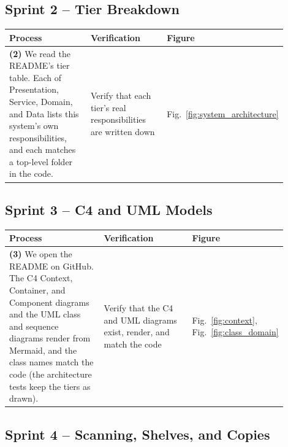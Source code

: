 \documentclass[12pt]{article}
\begin{document}
\subsection{Sprint 2 -- Tier Breakdown}

\begin{longtable}{L{0.4\linewidth} L{0.36\linewidth} L{0.14\linewidth}}
\toprule
\textbf{Process} & \textbf{Verification} & \textbf{Figure} \\
\midrule
\endhead
\textbf{(2)} We read the README's tier table. Each of Presentation, Service, Domain, and Data lists this system's own responsibilities, and each matches a top-level folder in the code. & Verify that each tier's real responsibilities are written down & Fig.~\ref{fig:system_architecture} \\
\bottomrule
\end{longtable}

\subsection{Sprint 3 -- C4 and UML Models}

\begin{longtable}{L{0.4\linewidth} L{0.36\linewidth} L{0.14\linewidth}}
\toprule
\textbf{Process} & \textbf{Verification} & \textbf{Figure} \\
\midrule
\endhead
\textbf{(3)} We open the README on GitHub. The C4 Context, Container, and Component diagrams and the UML class and sequence diagrams render from Mermaid, and the class names match the code (the architecture tests keep the tiers as drawn). & Verify that the C4 and UML diagrams exist, render, and match the code & Fig.~\ref{fig:context}, Fig.~\ref{fig:class_domain} \\
\bottomrule
\end{longtable}

\subsection{Sprint 4 -- Scanning, Shelves, and Copies}
\end{document}
